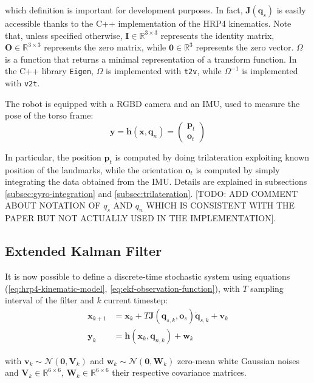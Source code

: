 \documentclass[a4paper]{article}
\begin{document}
\noindent which definition is important for development purposes.
In fact, $\bm{J}(\bm{q}_s)$ is easily accessible thanks to the
C++ implementation of the HRP4 kinematics. Note that, unless
specified otherwise, $\bm{I} \in \mathbb{R}^{3 \times 3}$
represents the identity matrix,
$\bm{O} \in \mathbb{R}^{3 \times 3}$
represents the zero matrix, while $\bm{0} \in \mathbb{R}^{3}$ 
represents the zero vector. $\bm{\varOmega}$ is a function that
returns a minimal representation of a transform function.
In the C++ library \texttt{Eigen}, $\bm{\varOmega}$ is
implemented
with \texttt{t2v}, while $\bm{\varOmega}^{-1}$ is implemented
with \texttt{v2t}.

The robot is equipped with a RGBD camera and an IMU, used
to measure the pose of the torso frame:
\begin{equation}
    \bm{y} = \bm{h}(\bm{x}, \bm{q}_n) =
        \begin{pmatrix}
            \bm{p}_t \\
            \bm{o}_t
        \end{pmatrix}
    \label{eq:ekf-observation-function}
\end{equation}

In particular, the position $\bm{p}_t$ is computed by doing
trilateration exploiting known position of the landmarks, while
the orientation $\bm{o}_t$ is computed by simply integrating
the data obtained from the IMU. Details are explained in
subsections \ref{subsec:gyro-integration} and
\ref{subsec:trilateration}. [TODO: ADD COMMENT ABOUT
NOTATION OF $q_s$ AND $q_n$ WHICH IS CONSISTENT WITH
THE PAPER BUT NOT ACTUALLY USED IN THE IMPLEMENTATION].

\subsection{Extended Kalman Filter}
It is now possible to define a discrete-time stochastic system
using equations (\ref{eq:hrp4-kinematic-model},
\ref{eq:ekf-observation-function}), with $T$ sampling
interval of the filter and $k$ current timestep:
\begin{align}
    \bm{x}_{k+1} &= \bm{x}_k + T \bm{J}(\bm{q}_{s,k}, \bm{o}_s) \bm{\dot{q}}_{s,k} + \bm{v}_k \\
    \bm{y}_k &= \bm{h}(\bm{x}_k, \bm{q}_{n,k}) + \bm{w}_k
\end{align}

\noindent with $\bm{v}_k \sim \bm{\mathcal{N}}(\bm{0}, \bm{V}_k)$ and $\bm{w}_k \sim \bm{\mathcal{N}}(\bm{0}, \bm{W}_k)$ zero-mean
white Gaussian noises and
$\bm{V}_k \in \mathbb{R}^{6 \times 6}$,
$\bm{W}_k \in \mathbb{R}^{6 \times 6}$ their respective
covariance matrices.
\end{document}
